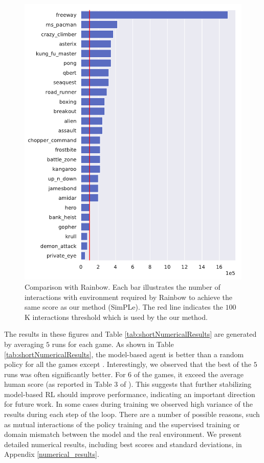 \begin{figure}[t]
\centering
\includegraphics[width=1.0\columnwidth]{figures/v1_eval_longmodel_vs_rainbow-1.png}
\vspace{-0.2cm}
\caption{Comparison with Rainbow. Each bar illustrates the number of interactions with environment required by Rainbow to achieve the same score as our method (SimPLe). The red line indicates the $100$K interactions threshold which is used by the our method.} 
\label{fig:compare_dopamine}
\end{figure}

The results in these figures and Table \ref{tab:shortNumericalResults} are generated by averaging $5$ runs for each game. As shown in Table \ref{tab:shortNumericalResults}, the model-based agent is better than a random policy for all the games except \bankh. Interestingly, we observed that the best of the $5$ runs was often significantly better. For $6$ of the games, it exceed the average human score (as reported in Table 3 of \cite{Pohlenetal2018}). This suggests that further stabilizing model-based RL should improve performance, indicating an important direction for future work. In some cases during training  we observed high variance of the results during each step of the loop. There are a number of possible reasons, such as mutual interactions of the policy training and the supervised training or domain mismatch between the model and the real environment. We present detailed numerical results, including best scores and standard deviations, in Appendix \ref{numerical_results}.

